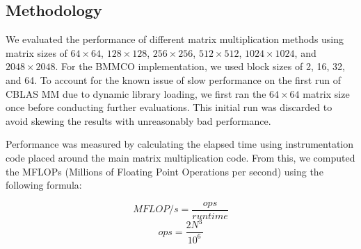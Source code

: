 \FloatBarrier

\subsection{Methodology}
\label{sec:methodology}

We evaluated the performance of different matrix multiplication methods using matrix sizes of \(64 \times 64\), \(128 \times 128\), \(256 \times 256\), \(512 \times 512\), \(1024 \times 1024\), and \(2048 \times 2048\). For the BMMCO implementation, we used block sizes of 2, 16, 32, and 64. To account for the known issue of slow performance on the first run of CBLAS MM due to dynamic library loading, we first ran the \(64 \times 64\) matrix size once before conducting further evaluations. This initial run was discarded to avoid skewing the results with unreasonably bad performance.

Performance was measured by calculating the elapsed time using instrumentation code placed around the main matrix multiplication code. From this, we computed the MFLOPs (Millions of Floating Point Operations per second) using the following formula:

\begin{displaymath}
    MFLOP/s = \frac{\textit{ops}}{\textit{runtime}}
\end{displaymath}
\begin{displaymath}
    \textit{ops} = \frac{2N^3}{10^6}
\end{displaymath}

